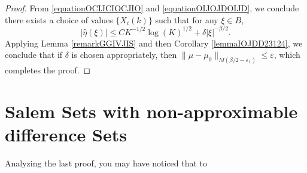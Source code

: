 \documentclass[12pt,reqno]{article}
\numberwithin{equation}{section}
\DeclareMathOperator{\ZZ}{\mathbf{Z}}
\numberwithin{theorem}{section}
\DeclareMathOperator{\EE}{\mathbf{E}}
\begin{document}
\begin{proof}
    From \eqref{equationOCIJCIOCJIO} and \eqref{equationOIJOJDOIJD}, we conclude there exists a choice of values $\{ X_i(k) \}$ such that for any $\xi \in B$,
    \begin{equation}
        |\widehat{\eta}(\xi)| \leq C K^{-1/2} \log(K)^{1/2} + \delta |\xi|^{-\beta/2}.
    \end{equation}
    Applying Lemma \ref{remarkGGIVJIS} and then Corollary \ref{lemmaIOJDD23124}, we conclude that if $\delta$ is chosen appropriately, then $\| \mu - \mu_0 \|_{M(\beta/2 - \varepsilon_1)} \leq \varepsilon$, which completes the proof.
\end{proof}


\section{Salem Sets with non-approximable difference Sets}

Analyzing the last proof, you may have noticed that to 
\end{document}
